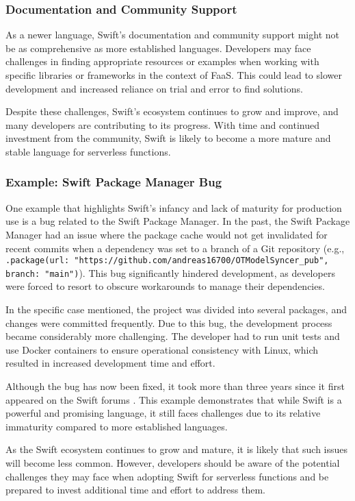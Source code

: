 \subsubsection{Documentation and Community Support}

As a newer language, Swift's documentation and community support might not be as comprehensive as more established languages. Developers may face challenges in finding appropriate resources or examples when working with specific libraries or frameworks in the context of FaaS. This could lead to slower development and increased reliance on trial and error to find solutions.

Despite these challenges, Swift's ecosystem continues to grow and improve, and many developers are contributing to its progress. With time and continued investment from the community, Swift is likely to become a more mature and stable language for serverless functions.

\subsubsection{Example: Swift Package Manager Bug}

One example that highlights Swift's infancy and lack of maturity for production use is a bug related to the Swift Package Manager. In the past, the Swift Package Manager had an issue where the package cache would not get invalidated for recent commits when a dependency was set to a branch of a Git repository 
(e.g., \texttt{.package(url: "https://github.com/andreas16700/OTModelSyncer_pub", branch: "main")}).
This bug significantly hindered development, as developers were forced to resort to obscure workarounds to manage their dependencies.

In the specific case mentioned, the project was divided into several packages, and changes were committed frequently. Due to this bug, the development process became considerably more challenging. The developer had to run unit tests and use Docker containers to ensure operational consistency with Linux, which resulted in increased development time and effort.

Although the bug has now been fixed, it took more than three years since it first appeared on the Swift forums
. This example demonstrates that while Swift is a powerful and promising language, it still faces challenges due to its relative immaturity compared to more established languages.

As the Swift ecosystem continues to grow and mature, it is likely that such issues will become less common. However, developers should be aware of the potential challenges they may face when adopting Swift for serverless functions and be prepared to invest additional time and effort to address them.

